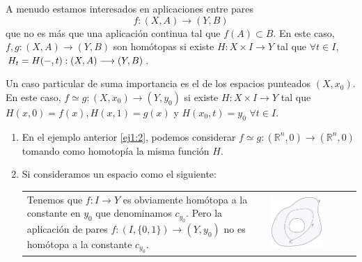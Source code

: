 A menudo estamos interesados en aplicaciones entre pares
$$f : (X, A) \longrightarrow (Y, B)$$ que no es más que una aplicación continua tal que $f(A) \subset B$. En este caso, $f, g : (X, A) \longrightarrow (Y, B)$ son homótopas si existe $H : X \times I \longrightarrow Y$ tal que $\forall t \in I$, $H_t = \nobreak H(-, t) : (X, A) \longrightarrow (Y, B)$.\par
Un caso particular de suma importancia es el de los espacios punteados $(X, x_0)$. En este caso, $f \simeq g : (X, x_0) \longrightarrow (Y, y_0)$ si existe $H: X \times I \longrightarrow Y$ tal que $H(x, 0) = f(x), H(x, 1) = g(x)$ y $H(x_0, t) = y_0$ $\forall t \in I$.\\
\begin{ejems}
\begin{enumerate}
\item \label{ej2:1} En el ejemplo anterior \ref{ej1:2}, podemos considerar $f \simeq g : (\mathbb{R}^n, 0) \longrightarrow (\mathbb{R}^n, 0)$ tomando como homotopía la misma función $H$.

\item \label{ej2:2} Si consideramos un espacio como el siguiente: \\
\begin{tabular}{ll}
\begin{minipage}{0.5\textwidth}
Tenemos que $f : I \longrightarrow Y$ es obviamente homótopa a la constante en $y_0$ que denominamos $c_{y_0}$. Pero la aplicación de pares $f : (I, \{ 0,1 \}) \longrightarrow (Y, y_0)$ no es homótopa a la constante $c_{y_0}$.
\end{minipage}
&
\begin{minipage}{0.5\textwidth}
\includegraphics[width=0.65\textwidth]{images/homotrelatalt.pdf}
\end{minipage}
\end{tabular}


\end{enumerate}
\end{ejems}
